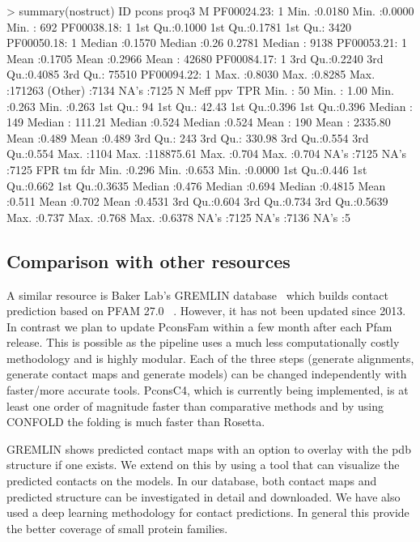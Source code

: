 \documentclass[a4,center,fleqn]{NAR}
\begin{document}
> summary(nostruct)
          ID           pcons            proq3              M
 PF00024.23:   1   Min.   :0.0180   Min.   :0.0000   Min.   :   692
 PF00038.18:   1   1st Qu.:0.1000   1st Qu.:0.1781   1st Qu.:  3420
 PF00050.18:   1   Median :0.1570   Median :0.26 0.2781   Median :  9138
 PF00053.21:   1   Mean   :0.1705   Mean   :0.2966   Mean   : 42680
 PF00084.17:   1   3rd Qu.:0.2240   3rd Qu.:0.4085   3rd Qu.: 75510
 PF00094.22:   1   Max.   :0.8030   Max.   :0.8285   Max.   :171263
 (Other)   :7134                                     NA's   :7125
       N             Meff                ppv             TPR
 Min.   :  50   Min.   :     1.00   Min.   :0.263   Min.   :0.263
 1st Qu.:  94   1st Qu.:    42.43   1st Qu.:0.396   1st Qu.:0.396
 Median : 149   Median :   111.21   Median :0.524   Median :0.524
 Mean   : 190   Mean   :  2335.80   Mean   :0.489   Mean   :0.489
 3rd Qu.: 243   3rd Qu.:   330.98   3rd Qu.:0.554   3rd Qu.:0.554
 Max.   :1104   Max.   :118875.61   Max.   :0.704   Max.   :0.704
                                    NA's   :7125    NA's   :7125
      FPR              tm             fdr
 Min.   :0.296   Min.   :0.653   Min.   :0.0000
 1st Qu.:0.446   1st Qu.:0.662   1st Qu.:0.3635
 Median :0.476   Median :0.694   Median :0.4815
 Mean   :0.511   Mean   :0.702   Mean   :0.4531
 3rd Qu.:0.604   3rd Qu.:0.734   3rd Qu.:0.5639
 Max.   :0.737   Max.   :0.768   Max.   :0.6378
 NA's   :7125    NA's   :7136    NA's   :5
\fi

\subsection{Comparison with other resources}

A similar resource is Baker Lab’s GREMLIN database~\cite{Kamisetty2013} which builds contact prediction based on
PFAM 27.0~\cite{Sonnhammer:1997} . However, it has not been updated since
2013. In contrast we plan to update PconsFam within a few month after
each Pfam release. This is possible as the pipeline uses a much less
computationally costly methodology and is highly modular. Each of the three steps
(generate alignments, generate contact maps and generate models) can be changed
independently with faster/more accurate tools. PconsC4, which is currently
being implemented, is at least one order of
magnitude faster than comparative methods and by using CONFOLD the
folding is much faster than Rosetta.


GREMLIN shows predicted contact maps with an option to overlay with
the pdb structure if one exists. We extend on this by using a tool
that can visualize the predicted contacts on the models. In our
database, both contact maps and predicted structure can be
investigated in detail and downloaded.  We have also used a deep
learning methodology for contact predictions. In general this provide
the better coverage of small protein families.
\end{document}
